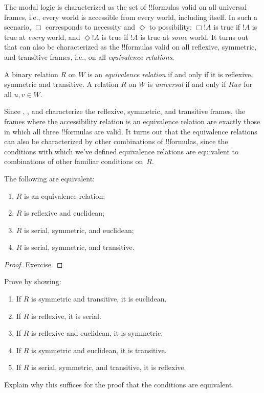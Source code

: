 \documentclass[../../../include/open-logic-section]{subfiles}
\begin{document}


The modal logic  is characterized as the set of !!{formula}s
valid on all universal frames, i.e., every world is accessible from
every world, including itself. In such a scenario, $\Box$ corresponds
to necessity and $\Diamond$ to possibility: $\Box !A$ is true if $!A$
is true at \emph{every} world, and $\Diamond !A$ is true if $!A$ is
true at \emph{some} world. It turns out that  can also be
characterized as the !!{formula}s valid on all reflexive, symmetric,
and transitive frames, i.e., on all \emph{equivalence relations}.

\begin{defn}
  A binary relation $R$ on $W$ is an \emph{equivalence relation} if
  and only if it is reflexive, symmetric and transitive.  A relation
  $R$ on $W$ is \emph{universal} if and only if $Ruv$ for all $u,v \in
  W$.
\end{defn}

Since , , and  characterize the reflexive,
symmetric, and transitive frames, the frames where the accessibility
relation is an equivalence relation are exactly those in which all
three !!{formula}s are valid. It turns out that the equivalence
relations can also be characterized by other combinations of
!!{formula}s, since the conditions with which we've defined
equivalence relations are equivalent to combinations of other familiar
conditions on~$R$.

\begin{prop}
  The following are equivalent:
  \begin{enumerate}
  \item $R$ is an equivalence relation;
  \item $R$ is reflexive and euclidean;
  \item $R$ is serial, symmetric, and euclidean;
  \item $R$ is serial, symmetric, and transitive.
  \end{enumerate}
\end{prop}

\begin{proof}
  Exercise.
\end{proof}

\begin{prob}
  Prove  by showing:
  \begin{enumerate}
  \item If $R$ is symmetric and transitive, it is euclidean.
  \item If $R$ is reflexive, it is serial.
  \item If $R$ is reflexive and euclidean, it is symmetric.
  \item If $R$ is symmetric and euclidean, it is transitive.
  \item If $R$ is serial, symmetric, and transitive, it is reflexive.
  \end{enumerate}
  Explain why this suffices for the proof that the conditions are
  equivalent.
\end{prob}
\end{document}
